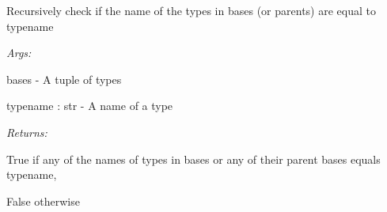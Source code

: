 \documentclass[letterpaper,10pt,english]{sphinxmanual}
\begin{document}
\begin{fulllineitems}
\label{modules/index:aosb.core.checkBaseClassesMatch}
Recursively check if the name of the types in bases (or parents) are equal to typename

\begin{DUlineblock}{0em}
\item[] \emph{Args:}
\item[]
\begin{DUlineblock}{\DUlineblockindent}
\item[] bases - A tuple of types
\item[] typename : str - A name of a type
\end{DUlineblock}
\end{DUlineblock}

\begin{DUlineblock}{0em}
\item[] \emph{Returns:}
\item[]
\begin{DUlineblock}{\DUlineblockindent}
\item[] True if any of the names of types in bases or any of their parent bases equals typename,
\item[]
\begin{DUlineblock}{\DUlineblockindent}
\item[] False otherwise
\end{DUlineblock}
\end{DUlineblock}
\end{DUlineblock}

\end{fulllineitems}

\end{document}

